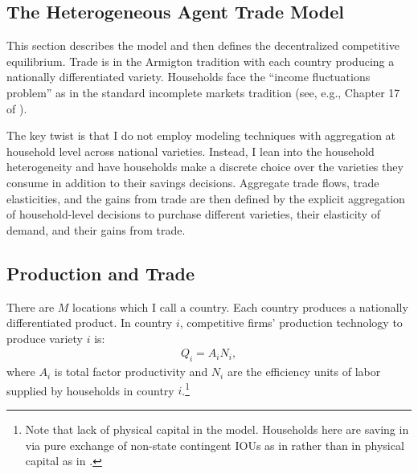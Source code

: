 \documentclass[12pt,pdftex]{article}
\begin{document}
\begin{onehalfspacing}


\section{The Heterogeneous Agent Trade Model}

This section describes the model and then defines the decentralized competitive equilibrium. Trade is in the Armigton tradition with each country producing a nationally differentiated variety. Households face the ``income fluctuations problem'' as in the standard incomplete markets tradition (see, e.g., Chapter 17 of \citet{ljungqvist2012recursive}).

The key twist is that I do not employ modeling techniques with aggregation at household level across national varieties. Instead, I lean into the household heterogeneity and have households make a discrete choice over the varieties they consume in addition to their savings decisions. Aggregate trade flows, trade elasticities, and the gains from trade are then defined by the explicit aggregation of household-level decisions to purchase different varieties, their elasticity of demand, and their gains from trade.

\subsection{Production and Trade}\label{sec:trade}

There are $M$ locations which I call a country. Each country produces a nationally differentiated product. In country $i$, competitive firms' production technology to produce variety $i$ is:
\begin{align}
Q_i = A_i N_i,
\label{eq:production}
\end{align}
where $A_i$ is total factor productivity and $N_i$ are the efficiency units of labor supplied by households in country $i$.\footnote{Note that lack of physical capital in the model. Households here are saving in via pure exchange of non-state contingent IOUs as in \citet{huggett1993risk} rather than in physical capital as in \citet{aiyagari1994uninsured}.}


\end{onehalfspacing}
\end{document}
